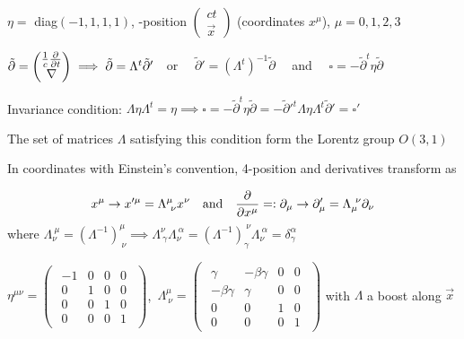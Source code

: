 \begin{squishlist}
\item $\eta =$ diag$(-1,1,1,1)$, -position $ \begin{pmatrix}
    ct\\
\vec{x}
\end{pmatrix}$ (coordinates $x^{\mu}$), $\mu = 0,1,2,3 $
\item 
$\tilde\partial = \begin{pmatrix}
    \frac{1}{c}\frac{\partial }{\partial t} \\
    \nabla 
\end{pmatrix}
\implies \tilde\partial = \Lambda^t\tilde\partial' \quad $or $ \quad \tilde\partial' = (\Lambda^t)^{-1}\tilde\partial \quad $ and $ \quad  \square =-\tilde\partial^t\eta\tilde\partial$

\item Invariance condition: $\Lambda\eta\Lambda^t= \eta \implies \square =-\tilde\partial^t\eta\tilde\partial =-\tilde\partial'^t\Lambda\eta\Lambda^t\tilde\partial'= \square' $ 
\item The set of matrices $\Lambda$ satisfying this condition form the Lorentz group $O(3,1)$

\item In coordinates with Einstein's convention, 4-position and derivatives transform as

$$x^\mu \rightarrow x'^{\mu} = \Lambda^{\mu}_{\ \nu} x^{\nu} \quad \text{and} \quad 
 \pad{}{x^\mu}=: \partial_\mu \rightarrow \partial_\mu' = \Lambda_\mu^{\ \nu}\partial_\nu
$$
where $\Lambda_\nu^{\ \mu}= (\Lambda^{-1})^\mu_{\ \nu} \implies \Lambda^{\nu}_{\ \gamma}\Lambda_{\nu}^{\ \alpha} = (\Lambda^{-1})_{\gamma}^{\ \nu} \Lambda_{\nu}^{\ \alpha} = \delta_{\gamma}^{\alpha}$

\item $\eta^{\mu\nu}=
\begin{pmatrix}
\begin{array}{cccc}
-1 & 0 & 0 & 0 \\ 
0 & 1 & 0 & 0 \\ 
0 & 0 & 1 & 0 \\ 
0 & 0 & 0 & 1
\end{array} 
\end{pmatrix}$,\, $
\Lambda^\mu_{\ \nu}=
\begin{pmatrix}
\begin{array}{cccc}
\gamma & -\beta \gamma & 0 & 0 \\ 
-\beta \gamma & \gamma & 0 & 0 \\ 
0 & 0 & 1 & 0 \\ 
0 & 0 & 0 & 1
\end{array} 
\end{pmatrix}$
with $\Lambda$ a boost along $\vec{x}$


\end{squishlist}
